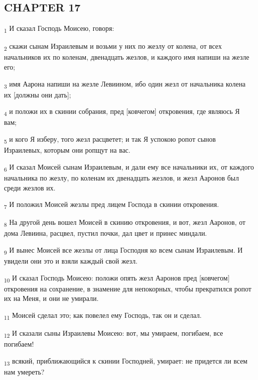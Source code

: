 \subsection{CHAPTER 17}
\begin{tcolorbox}
\textsubscript{1} И сказал Господь Моисею, говоря:
\end{tcolorbox}
\begin{tcolorbox}
\textsubscript{2} скажи сынам Израилевым и возьми у них по жезлу от колена, от всех начальников их по коленам, двенадцать жезлов, и каждого имя напиши на жезле его;
\end{tcolorbox}
\begin{tcolorbox}
\textsubscript{3} имя Аарона напиши на жезле Левиином, ибо один жезл от начальника колена их [должны они дать];
\end{tcolorbox}
\begin{tcolorbox}
\textsubscript{4} и положи их в скинии собрания, пред [ковчегом] откровения, где являюсь Я вам;
\end{tcolorbox}
\begin{tcolorbox}
\textsubscript{5} и кого Я изберу, того жезл расцветет; и так Я успокою ропот сынов Израилевых, которым они ропщут на вас.
\end{tcolorbox}
\begin{tcolorbox}
\textsubscript{6} И сказал Моисей сынам Израилевым, и дали ему все начальники их, от каждого начальника по жезлу, по коленам их двенадцать жезлов, и жезл Ааронов был среди жезлов их.
\end{tcolorbox}
\begin{tcolorbox}
\textsubscript{7} И положил Моисей жезлы пред лицем Господа в скинии откровения.
\end{tcolorbox}
\begin{tcolorbox}
\textsubscript{8} На другой день вошел Моисей в скинию откровения, и вот, жезл Ааронов, от дома Левиина, расцвел, пустил почки, дал цвет и принес миндали.
\end{tcolorbox}
\begin{tcolorbox}
\textsubscript{9} И вынес Моисей все жезлы от лица Господня ко всем сынам Израилевым. И увидели они это и взяли каждый свой жезл.
\end{tcolorbox}
\begin{tcolorbox}
\textsubscript{10} И сказал Господь Моисею: положи опять жезл Ааронов пред [ковчегом] откровения на сохранение, в знамение для непокорных, чтобы прекратился ропот их на Меня, и они не умирали.
\end{tcolorbox}
\begin{tcolorbox}
\textsubscript{11} Моисей сделал это; как повелел ему Господь, так он и сделал.
\end{tcolorbox}
\begin{tcolorbox}
\textsubscript{12} И сказали сыны Израилевы Моисею: вот, мы умираем, погибаем, все погибаем!
\end{tcolorbox}
\begin{tcolorbox}
\textsubscript{13} всякий, приближающийся к скинии Господней, умирает: не придется ли всем нам умереть?
\end{tcolorbox}
